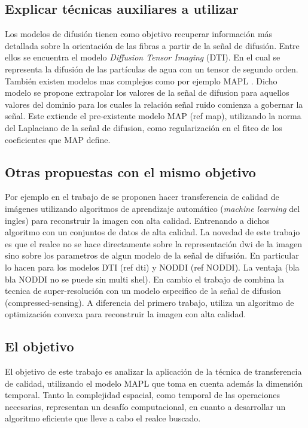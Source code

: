 \documentclass[a4paper,10pt]{article}
\begin{document}
\subsection{Explicar técnicas auxiliares a utilizar}
Los modelos de difusión tienen como objetivo recuperar información más detallada sobre la orientación de las fibras a 
partir de la señal de difusión. Entre ellos se encuentra el modelo \textit{Diffusion Tensor Imaging} (DTI). En el cual 
se representa la difusión de las partículas de agua con un tensor de segundo orden. También existen modelos mas 
complejos como por ejemplo MAPL \citep{Fick2016365}. Dicho modelo se propone extrapolar los 
valores de la se\~nal de difusion para aquellos valores del dominio para los cuales la relaci\'on 
se\~nal ruido comienza a gobernar la se\~nal. Este extiende el pre-existente modelo MAP (ref 
map), utilizando la norma del Laplaciano de la se\~nal de difusion, como regularizaci\'on en el 
fiteo de los coeficientes que MAP define.


\subsection{Otras propuestas con el mismo objetivo}
Por ejemplo en el trabajo de \citet{Alexander2014} se proponen hacer transferencia de 
calidad de imágenes utilizando algoritmos de aprendizaje automático 
(\textit{machine learning} del ingles) para reconstruir la imagen con alta 
calidad. Entrenando a dichos algoritmo con un conjuntos de datos de alta 
calidad. La novedad de este trabajo es que el realce no se hace directamente 
sobre la representación dwi de la imagen sino sobre los parametros de algun 
modelo de la señal de difusión. En particular lo hacen para los modelos DTI (ref 
dti) y NODDI (ref NODDI). La ventaja (bla bla NODDI no se puede sin multi 
shel). En cambio el trabajo de \citet{Ning2016} combina la tecnica de super-resolución 
con un modelo especifico de la señal de difusion (compressed-sensing). A 
diferencia del primero trabajo, utiliza un algoritmo de optimización convexa 
para reconstruir la imagen con alta calidad.

\subsection{El objetivo}
El objetivo de este trabajo es analizar la aplicación de la técnica de 
transferencia de calidad, utilizando el modelo MAPL que toma en cuenta además 
la dimensión temporal. Tanto la complejidad espacial, como temporal de las 
operaciones necesarias, representan un desafío computacional, en cuanto a 
desarrollar un algoritmo eficiente que lleve a cabo el realce buscado.





\clearpage


\end{document}
